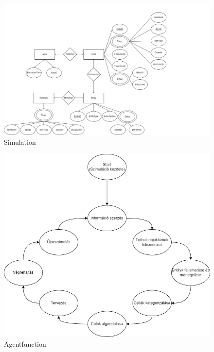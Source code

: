 \begin{figure}[!ht]
	\centering
	\includegraphics[scale=0.3]{images/simulationER.png}
	\caption{Simulation}
	\label{fig:simulation}
\end{figure}

\begin{figure}[!ht]
	\centering
	\includegraphics[scale=0.6]{images/agentfunction.png}
	\caption{Agentfunction}
	\label{fig:agentfunction}
\end{figure}